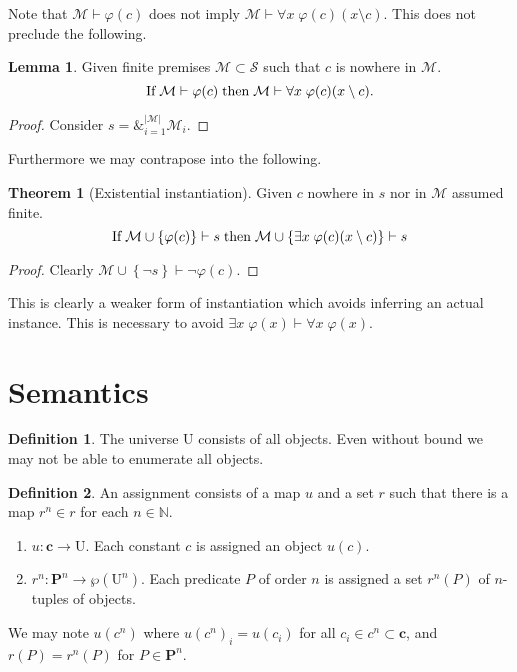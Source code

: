 \documentclass{amsbook}
\newcommand{\setsm}[1]{\left\{#1\right\}}
\newcommand{\infers}{\mathrel\vdash}
\newcommand{\univ}[1]{\mathord\forall#1\;}
\newcommand{\exis}[1]{\mathord\exists#1\;}
\DeclareMathOperator*{\amp}{\&}
\theoremstyle{definition}
\newtheorem{thm}{Theorem}[section]
\newtheorem{lmm}{Lemma}[section]
\newtheorem{dfn}{Definition}[section]
\begin{document}
Note that $\mathcal M \infers \varphi(c)$ does not imply $\mathcal M \infers \univ x \varphi(c)(x \setminus c)$. This does not preclude the following.

\begin{lmm}
    Given finite premises $\mathcal M \subset \mathcal S$ such that $c$ is nowhere in $\mathcal M$.
    $$\text{If\;} \mathcal M \infers \varphi(c) \text{\;then\;} \mathcal M \infers \univ x \varphi(c)(x \setminus c)\text.$$
    \begin{proof}
        Consider $s = \amp_{i=1}^{|\mathcal M|} \mathcal M_i$.
    \end{proof}
\end{lmm}

Furthermore we may contrapose into the following.

\begin{thm}[Existential instantiation]
    Given $c$ nowhere in $s$ nor in $\mathcal M$ assumed finite.
    $$\text{If\;} \mathcal M \cup \setsm{\varphi(c)} \infers s \text{\;then\;} \mathcal M \cup \setsm{\exis x \varphi(c)(x \setminus c)} \infers s$$
    \begin{proof}
        Clearly $\mathcal M \cup \setsm{\neg s} \infers \neg\varphi(c)$.
    \end{proof}
\end{thm}

This is clearly a weaker form of instantiation which avoids inferring an actual instance. This is necessary to avoid $\exis x \varphi(x) \infers \univ x \varphi(x)$.

\section{Semantics}

\begin{dfn}
    The universe $\mathrm U$ consists of all objects. Even without bound we may not be able to enumerate all objects.
\end{dfn}

\begin{dfn}
    An assignment consists of a map $u$ and a set $r$ such that there is a map $r^n \in r$ for each $n \in \mathbb N$.
    \begin{enumerate}
        \item $u: \mathbf c \longrightarrow \mathrm U$.
              Each constant $c$ is assigned an object $u(c)$.
        \item $r^n: \mathbf P^n \longrightarrow \wp(\mathrm U^n)$.
              Each predicate $P$ of order $n$ is assigned a set $r^n(P)$ of $n$-tuples of objects.
    \end{enumerate}
    We may note $u(c^n)$ where $u(c^n)_i = u(c_i)$ for all $c_i \in c^n \subset \mathbf c$, and $r(P) = r^n(P)$ for $P \in \mathbf P^n$.
\end{dfn}
\end{document}
